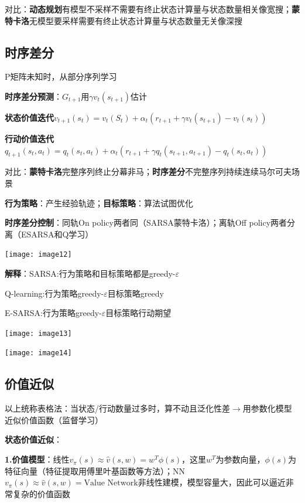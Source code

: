 	对比：\textbf{动态规划}有模型不采样不需要有终止状态计算量与状态数量相关像宽搜；\textbf{蒙特卡洛}无模型要采样需要有终止状态计算量与状态数量无关像深搜
	
	\subsection*{时序差分}
	P矩阵未知时，从部分序列学习
	
	\textbf{时序差分预测}：$G_{t+1}$用$\gamma v_t(s_{t+1})$估计
	
	\textbf{状态价值迭代}$v_{t+1}(s_{t})=v_{t}(S_{t})+\alpha_{t}(r_{t+1}+\gamma v_{t}(s_{t+1})-v_{t}(s_{t}))$
	
	\textbf{行动价值迭代}$q_{t+1}(s_t, a_t) = q_t(s_t, a_t) + \alpha_t(r_{t+1} + \gamma q_t(s_{t+1}, a_{t+1}) - q_t(s_t, a_t))$
	
	对比：\textbf{蒙特卡洛}完整序列终止分幕非马；\textbf{时序差分}不完整序列持续连续马尔可夫场景
	
	\textbf{行为策略}：产生经验轨迹；\textbf{目标策略}：算法试图优化
	
	\textbf{时序差分控制}：同轨On policy两者同（SARSA蒙特卡洛）；离轨Off policy两者分离（ESARSA和Q学习）
	
	\begin{figurehere}
		\centering
		\texttt{[image: image12]}
		\label{fig:image12}
	\end{figurehere}
	\textbf{解释}：SARSA:行为策略和目标策略都是greedy-$\varepsilon$
	
	Q-learning:行为策略greedy-$\varepsilon$目标策略greedy
	
	E-SARSA:行为策略greedy-$\varepsilon$目标策略行动期望
	
	\begin{figurehere}
		\centering
		\texttt{[image: image13]}
		\label{fig:image13}
	\end{figurehere}
	\begin{figurehere}
		\centering
		\texttt{[image: image14]}
		\label{fig:image14}
	\end{figurehere}
	
	\subsection*{价值近似}
	以上统称表格法：当状态/行动数量过多时，算不动且泛化性差$\rightarrow$用参数化模型近似价值函数（监督学习）
	
	\textbf{状态价值近似}：
	
	\textbf{1.价值模型}：线性$v_\pi(s)\approx\hat{v}(s, w)=w^T\phi(s)$，这里$w^T$为参数向量，$\phi(s)$为特征向量（特征提取用傅里叶基函数等方法）；NN$v_\pi(s)\approx\hat{v}(s, w)=\text{Value Network}$非线性建模，模型容量大，因此可以逼近非常复杂的价值函数
	
